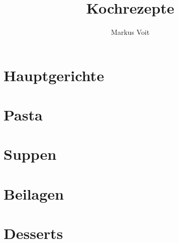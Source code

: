 \documentclass[DIV=11, pagesize, fontsize=11pt, paper=a4, numbers=noenddot]{scrartcl}
\title{Kochrezepte}
\author{Markus Voit}
\begin{document}
\maketitle

\tableofcontents
\clearpage

\section{Hauptgerichte}
\newpage{}
\newpage{}
\newpage{}
\newpage{}
\newpage{}
\newpage{}
\newpage{}
\newpage{}
\newpage{}
\newpage{}
\newpage{}
\newpage{}
\newpage{}
\newpage{}
\newpage{}
\newpage{}

\section{Pasta}
\newpage{}
\newpage{}
\newpage{}
\newpage{}

\section{Suppen}
\newpage{}
\newpage{}

\section{Beilagen}
\newpage{}
\newpage{}
\newpage{}
\newpage{}

\section{Desserts}
\newpage{}
\newpage{}
\newpage{}
\newpage{}
\newpage{}
\newpage{}
\end{document}
